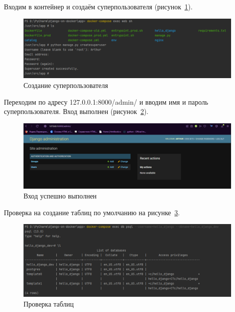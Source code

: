 Входим в контейнер и создаём суперпользователя (рисунок~\ref{rndhpcgui.2022.10.29.picture3}).
\begin{figure}[!ht]
  \centering
  \includegraphics[scale=0.8]{ResearchNotes/rndhpc_dev_gui_2022_10_29/rndhpcgui.2022.10.29.picture3.png}
  \caption{Создание суперпользователя}
  \label{rndhpcgui.2022.10.29.picture3}
\end{figure}

Переходим по адресу \textsf{127.0.0.1:8000/admin/} и вводим имя и пароль суперпользователя. Вход выполнен (рисунок~\ref{rndhpcgui.2022.10.29.picture4}).
\begin{figure}[!ht]
  \centering
  \includegraphics[scale=0.8]{ResearchNotes/rndhpc_dev_gui_2022_10_29/rndhpcgui.2022.10.29.picture4.png}
  \caption{Вход успешно выполнен}
  \label{rndhpcgui.2022.10.29.picture4}
\end{figure}

Проверка на создание таблиц по умолчанию на рисунке~\ref{rndhpcgui.2022.10.29.picture5}.
\begin{figure}[!ht]
  \centering
  \includegraphics[scale=0.8]{ResearchNotes/rndhpc_dev_gui_2022_10_29/rndhpcgui.2022.10.29.picture5.png}
  \caption{Проверка таблиц}
  \label{rndhpcgui.2022.10.29.picture5}
\end{figure}
\noteattributes{}
